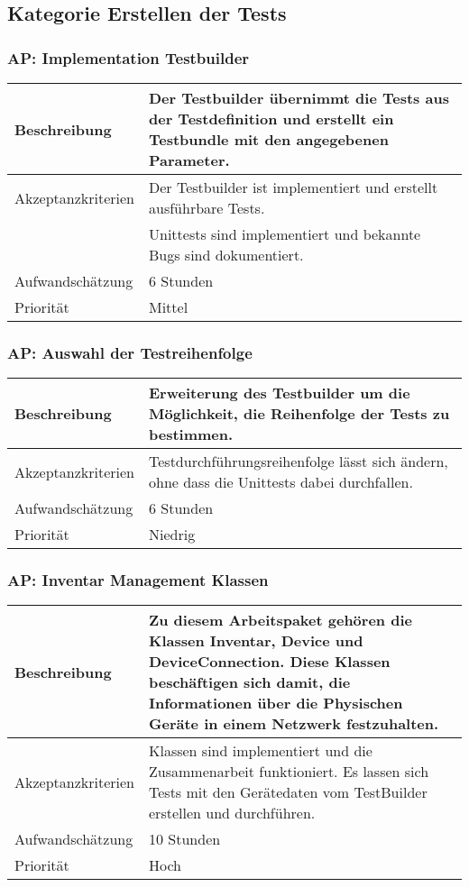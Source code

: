 \documentclass[
	ngerman,
	toc=listof, %
	toc=bibliography, %
	footnotes=multiple, %
	parskip=half, %
	numbers=noendperiod %
]{scrartcl}
\begin{document}
	\subsection{Kategorie Erstellen der Tests}

	\subsubsection{AP: Implementation Testbuilder}
	\begin{tabularx}{\textwidth}{lX}
		\toprule
		Beschreibung & Der Testbuilder übernimmt die Tests aus der Testdefinition und erstellt ein Testbundle mit den angegebenen Parameter. \\
		\midrule
		Akzeptanzkriterien & Der Testbuilder ist implementiert und erstellt ausführbare Tests.\\
		 & Unittests sind implementiert und bekannte Bugs sind dokumentiert. \\
		\midrule
		Aufwandschätzung & 6 Stunden\\
		\midrule
		Priorität & Mittel\\
		\bottomrule
	\end{tabularx}

	\subsubsection{AP: Auswahl der Testreihenfolge}
	\begin{tabularx}{\textwidth}{lX}
		\toprule
		Beschreibung & Erweiterung des Testbuilder um die Möglichkeit, die Reihenfolge der Tests zu bestimmen.\\
		\midrule
		Akzeptanzkriterien & Testdurchführungsreihenfolge lässt sich ändern, ohne dass die Unittests dabei durchfallen. \\
		\midrule
		Aufwandschätzung & 6 Stunden\\
		\midrule
		Priorität & Niedrig\\
		\bottomrule
	\end{tabularx}

	\subsubsection{AP: Inventar Management Klassen}
	\begin{tabularx}{\textwidth}{lX}
		\toprule
		Beschreibung & Zu diesem Arbeitspaket gehören die Klassen Inventar, Device und DeviceConnection. Diese Klassen beschäftigen sich damit, die Informationen über die Physischen Geräte in einem Netzwerk festzuhalten.\\
		\midrule
		Akzeptanzkriterien & Klassen sind implementiert und die Zusammenarbeit funktioniert. Es lassen sich Tests mit den Gerätedaten vom TestBuilder erstellen und durchführen.\\
		\midrule
		Aufwandschätzung & 10 Stunden\\
		\midrule
		Priorität & Hoch \\
		\bottomrule
	\end{tabularx}
	\newpage
\end{document}
